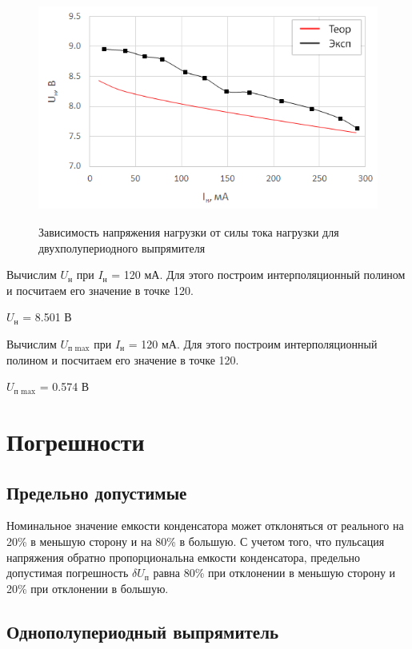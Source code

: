 \begin{figure}[H]
	\begin{center}
		\includegraphics[height=7.5cm]{img/5}
		\caption{Зависимость напряжения нагрузки от силы тока нагрузки для двухполупериодного выпрямителя}
		\label{g:5} %
	\end{center}
\end{figure}

Вычислим $U_\text{н}$ при $I_\text{н}$ = 120 мА. Для этого построим интерполяционный полином и посчитаем его значение в точке 120.

$U_\text{н}$ = 8.501 В

Вычислим $U_\text{п max}$ при $I_\text{н}$ = 120 мА. Для этого построим интерполяционный полином и посчитаем его значение в точке 120.

$U_\text{п max}$ = 0.574 В

\section{Погрешности}

\subsection{Предельно допустимые}

Номинальное значение емкости конденсатора может отклоняться от реального на 20\% в меньшую сторону и на 80\% в большую. С учетом того, что пульсация напряжения обратно пропорциональна емкости конденсатора, предельно допустимая погрешность $\delta U_\text{п}$ равна 80\% при отклонении в меньшую сторону и 20\% при отклонении в большую.

\subsection{Однополупериодный выпрямитель}

